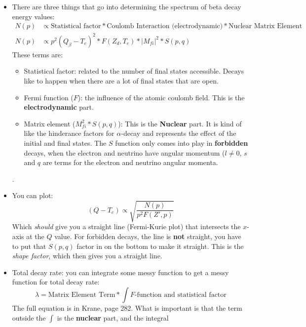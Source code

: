 \documentclass[letter]{article}
\begin{document}
\begin{itemize}
\item There are three things that go into
  determining the spectrum of beta decay energy values:
  \begin{equation*}
    \begin{split}
    N(p) &\propto \text{Statistical factor} * \text{Coulomb Interaction
    (electrodynamic)} * \text{Nuclear Matrix Element} \\
  N(p) &\propto p^2(Q_\beta-T_e)^2*F(Z_d,T_e)*|M_{fi}|^2*S(p,q)
\end{split}
\end{equation*}
These terms are:
\begin{itemize}
\item Statistical factor: related to the number of final states
  accessible. Decays like to happen when there are a lot of final
  states that are open.
\item Fermi function ($F$): the influence of the atomic coulomb
  field. This is the \textbf{electrodynamic} part.
\item Matrix element ($M_{fi}^2*S(p,q)$): This is the \textbf{Nuclear}
  part. It is kind of like the hinderance factors for $\alpha$-decay
  and represents the effect of the initial and final states. The $S$
  function only comes into play in \textbf{forbidden} decays, when the
  electron and neutrino have angular momentum ($l \neq 0$, $s$ and $q$
  are terms for the electron and neutrino angular momenta.
\end{itemize}
\cite[pp.281-282]{krane}.
\item You can plot:
  \begin{equation*}
    (Q-T_e) \propto \sqrt{\frac{N(p)}{p^2F(Z',p)}}
  \end{equation*}
Which \textit{should} give you a straight line (Fermi-Kurie plot) that intersects the
$x$-axis at the $Q$ value. For forbidden decays, the line is
\textbf{not} straight, you have to put that $S(p,q)$ factor in on the
bottom to make it straight. This is the \textit{shape factor}, which
then gives you a straight line.~\cite[pp. 282]{krane}
\item Total decay rate: you can integrate some messy function to get a
  messy function for total decay rate:
  \begin{equation*}
    \lambda = \text{Matrix Element Term} * \int\text{$F$-function and statistical factor}
  \end{equation*}
The full equation is in Krane, page 282. What is important is that the
term outside the $\int$ is the \textbf{nuclear} part, and the integral

\end{itemize}
\end{document}
